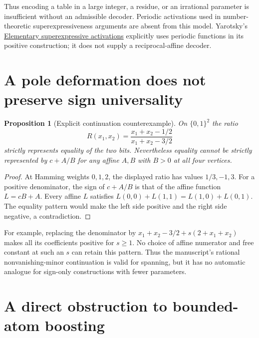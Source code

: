 \documentclass[11pt]{article}
\newtheorem{proposition}{Proposition}
\begin{document}
Thus encoding a table in a large integer, a residue, or an irrational
parameter is insufficient without an admissible decoder. Periodic
activations used in number-theoretic superexpressiveness arguments are
absent from this model. Yarotsky's
\href{https://proceedings.mlr.press/v139/yarotsky21a.html}{Elementary
superexpressive activations} explicitly uses periodic functions in its
positive construction; it does not supply a reciprocal-affine decoder.

\section{A pole deformation does not preserve sign universality}

\begin{proposition}[Explicit continuation counterexample]
On $\{0,1\}^2$ the ratio
\[
 R(x_1,x_2)=\frac{x_1+x_2-1/2}{x_1+x_2-3/2}
\]
strictly represents equality of the two bits. Nevertheless equality
cannot be strictly represented by $c+A/B$ for any affine $A,B$ with
$B>0$ at all four vertices.
\end{proposition}
\begin{proof}
At Hamming weights $0,1,2$, the displayed ratio has values $1/3,-1,3$.
For a positive denominator, the sign of $c+A/B$ is that of the affine
function $L=cB+A$. Every affine $L$ satisfies
$L(0,0)+L(1,1)=L(1,0)+L(0,1)$.
The equality pattern would make the left side positive and the right
side negative, a contradiction.
\end{proof}

For example, replacing the denominator by
$x_1+x_2-3/2+s(2+x_1+x_2)$ makes all its coefficients positive for
$s\ge1$. No choice of affine numerator and free constant at such an
$s$ can retain this pattern. Thus the manuscript's rational
nonvanishing-minor continuation is valid for spanning, but it has no
automatic analogue for sign-only constructions with fewer parameters.

\section{A direct obstruction to bounded-atom boosting}
\end{document}
